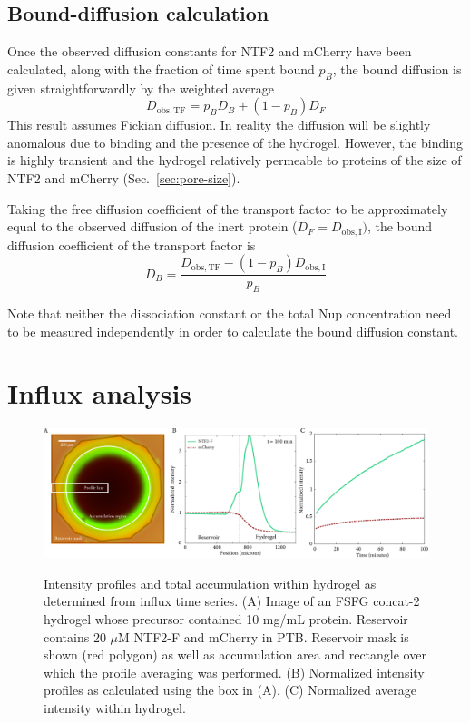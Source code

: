 \subsection{Bound-diffusion calculation}
\label{sec:db-calc}

Once the observed diffusion constants for NTF2 and mCherry have been calculated, along with the fraction of time spent bound $p_B$, the bound diffusion is given straightforwardly by the weighted average
\begin{equation}
D_\mathrm{obs, TF} = p_B D_B + (1-p_B) D_F
\label{eq:weighted-average}
\end{equation}
This result assumes Fickian diffusion.  In reality the diffusion will be slightly anomalous due to binding and the presence of the hydrogel.  However, the binding is highly transient and the hydrogel relatively permeable to proteins of the size of NTF2 and mCherry (Sec.~\ref{sec:pore-size}).

Taking the free diffusion coefficient of the transport factor to be approximately equal to the observed diffusion of the inert protein ($D_F = D_\mathrm{obs,I})$, the bound diffusion coefficient of the transport factor is
\begin{equation}
D_B = \frac{D_\mathrm{obs, TF}-(1-p_B) D_\mathrm{obs,I}}{p_B}
\label{eq:d-bound}
\end{equation}

Note that neither the dissociation constant or the total Nup concentration need to be measured independently in order to calculate the bound diffusion constant.

\section{Influx analysis}
\label{sec:influx-analysis}

\begin{figure}[t!]
\caption[Intensity profiles and accumulation curve from influx experiments.]{Intensity profiles and total accumulation within hydrogel as determined from influx time series.  (A) Image of an FSFG concat-2 hydrogel whose precursor contained 10 mg/mL protein. Reservoir contains 20 $\mu$M NTF2-F and mCherry in PTB. Reservoir mask is shown (red polygon) as well as accumulation area and rectangle over which the profile averaging was performed. (B) Normalized intensity profiles as calculated using the box in (A).  (C) Normalized average intensity within hydrogel.}
\centering
\includegraphics[width=\textwidth]{figs/ch04/influx-plots.pdf}
\label{fig:influx-plots}
\end{figure}

